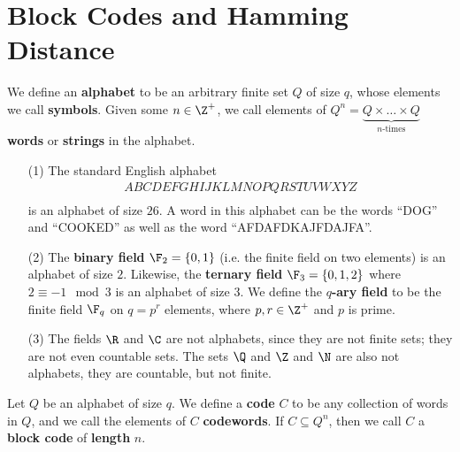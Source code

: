 \section{Block Codes and Hamming Distance}\label{section_1.1}

\begin{definition}
  We define an \textbf{alphabet} to be an arbitrary finite set $Q$ of size $q$,
  whose elements we call \textbf{symbols}. Given some $n \in \Z^+$, we call
  elements of $Q^n=\underbrace{Q \times \dots \times Q}_{n\text{-times}}$
  \textbf{words} or \textbf{strings} in the alphabet.
\end{definition}

\begin{example}\label{example_1.1}
  \begin{enumerate}
    \item[(1)] The standard English alphabet
      \begin{align*}
        A B C D E F G H I J K L M N O P Q R S T U V W X Y Z \\
      \end{align*}
      is an alphabet of size $26$. A word in this alphabet can be the words
      ``DOG'' and ``COOKED'' as well as the word ``AFDAFDKAJFDAJFA''.

    \item[(2)] The \textbf{binary field} $\F_2=\{0,1\}$  (i.e. the finite field
      on two elements) is an alphabet of size $2$. Likewise, the
      \textbf{ternary field} $\F_3=\{0,1,2\}$ where $2 \equiv -1 \mod{3}$ is an
      alphabet of size $3$. We define the  \textbf{$q$-ary field} to be the
      finite field $\F_q$ on $q=p^r$ elements, where  $p,r \in \Z^+$ and $p$ is
      prime.

    \item[(3)] The fields $\R$ and $\C$ are not alphabets, since they are not
      finite sets; they are not even countable sets. The sets $\Q$ and $\Z$ and
      $\N$ are also not alphabets, they are countable, but not finite.
  \end{enumerate}
\end{example}

\begin{definition}
  Let $Q$ be an alphabet of size $q$. We define a \textbf{code} $C$ to be any
  collection of words in $Q$, and we call the elements of $C$
  \textbf{codewords}. If $C \subseteq Q^n$, then we call $C$ a  \textbf{block
  code} of \textbf{length} $n$.
\end{definition}

